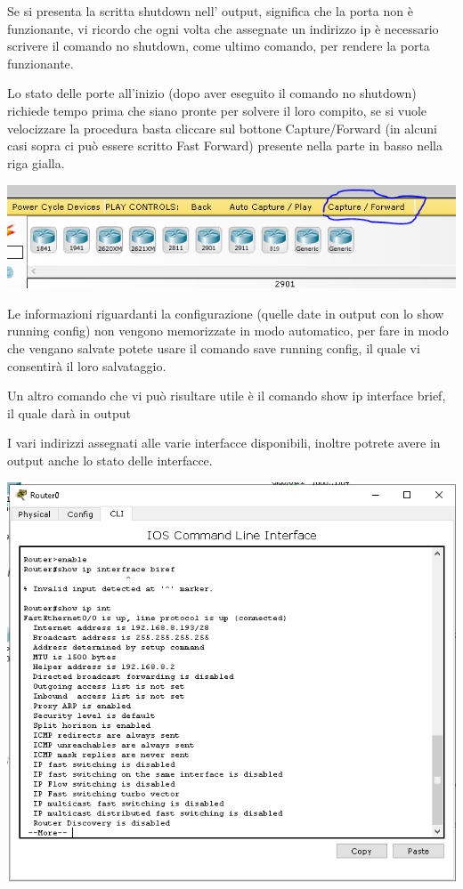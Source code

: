 Se si presenta la scritta shutdown nell’ output, significa che la porta non è funzionante, vi ricordo che ogni volta che assegnate un indirizzo ip è necessario scrivere il comando no shutdown, come ultimo comando, per rendere la porta funzionante.

Lo stato delle porte all'inizio (dopo aver eseguito il comando no shutdown) richiede tempo prima che siano pronte per solvere il loro compito, se si vuole velocizzare la procedura basta cliccare sul bottone Capture/Forward (in alcuni casi sopra ci può essere scritto Fast Forward) presente nella parte in basso nella riga gialla.

\begin{center}
    \includegraphics[width=\linewidth]{images/04.debugging-rete/02.png}
\end{center}

Le informazioni riguardanti la configurazione (quelle date in output con lo show running config) non vengono memorizzate in modo automatico, per fare in modo che vengano salvate potete usare il comando save running config, il quale vi consentirà il loro salvataggio.

Un altro comando che vi può risultare utile è il comando show ip interface brief, il quale darà in output

I vari indirizzi assegnati alle varie interfacce disponibili, inoltre potrete avere in output anche lo stato delle interfacce. 

\begin{center}
    \includegraphics[width=\linewidth]{images/04.debugging-rete/03.png}
\end{center}

